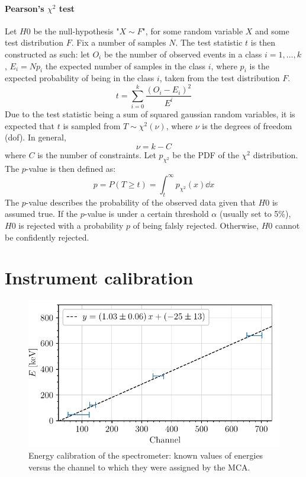 \paragraph{Pearson's \(\chi^2\) test}
Let \(H0\) be the null-hypothesis "\(X \sim F\)", for some random variable \(X\) and some test distribution \(F\). Fix a number of samples \(N\).
The test statistic \(t\) is then constructed as such: let \(O_i\) be the number of observed events in a class \(i=1,\dots,k\), \(E_i = Np_i\) the expected number of samples in the class \(i\), where \(p_i\) is the expected probability of being in the class \(i\), taken from the test distribution \(F\).
\begin{equation}
    t = \sum_{i=0}^k \frac{(O_i - E_i)^2}{E^i}
\end{equation}
Due to the test statistic being a sum of squared gaussian random variables, it is expected that \(t\) is sampled from \(T \sim \chi^2(\nu)\), where \(\nu\) is the degrees of freedom (dof). In general,
\begin{equation}
    \nu = k-C
\end{equation} 
where \(C\) is the number of constraints. Let \(p_{\chi^2}\) be the PDF of the \(\chi^2\) distribution. The \(p\)-value is then defined as:
\begin{equation}
    p = P(T \ge t) = \int_t^\infty p_{\chi^2}(x) \dd x
\end{equation}
The \(p\)-value describes the probability of the observed data given that \(H0\) is assumed true. If the \(p\)-value is under a certain threshold \(\alpha\) (usually set to 5\%), \(H0\) is rejected with a probability \(p\) of being falsly rejected. Otherwise, \(H0\) cannot be confidently rejected.

\section{Instrument calibration}
\label{sec:calibration}
\begin{figure}[htbp]
    \centering
    \includegraphics[scale=1]{figures/calibration_energy.pdf}
    \caption{Energy calibration of the spectrometer: known values of energies 
    versus the channel to which they were assigned by the MCA.}
    \label{fig:calibration_energy}
\end{figure}


